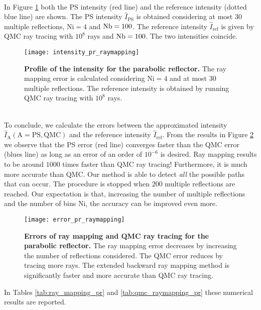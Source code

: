 \\ \indent In Figure \ref{fig:intensity_pr_raymapping} both the PS intensity (red line) and the reference intensity (dotted blue line) are shown. The PS intensity $\hat{I}_{\textrm{PS}}$ is obtained considering at most $30$ multiple reflections, $\textrm{Ni}=4$ and $\textrm{Nb} = 100$. The reference intensity $\hat{I}_{\textrm{ref}}$ is given by QMC ray tracing with $10^8$ rays and $\textrm{Nb} = 100$. The two intensities coincide.
\begin{figure}[t]
  \begin{center}
  \texttt{[image: intensity\_pr\_raymapping]}
  \end{center}
  \caption{\textbf{Profile of the intensity for the parabolic reflector.}
The ray mapping error is calculated considering $\textrm{Ni}=4$ and at most $30$ multiple reflections. The reference intensity is obtained by running QMC ray tracing with $10^8$ rays.}
\label{fig:intensity_pr_raymapping}
 \end{figure}
\\ \indent
To conclude, we calculate the errors between the approximated intensity $\hat{I}_{\textrm{A}} (\textrm{A}=\textrm{PS}, \textrm{QMC})$ and the reference intensity $\hat{I}_{\textrm{ref}}$. From the results in Figure \ref{fig:error_raymapping_pr} we observe that the PS error (red line) converges faster than the QMC error (blues line) as long as an error of an order of $10^{-6}$ is desired. Ray mapping results to be around $1000$ times faster than QMC ray tracing! Furthermore, it is much more accurate than QMC. Our method is able to detect \textit{all} the possible paths that can occur. The procedure is stopped when $200$ multiple reflections are reached. Our expectation is that, increasing the number of multiple reflections and the number of bins $\textrm{Ni}$, the accuracy can be improved even more.
\begin{figure}[h]
  \begin{center}
  \texttt{[image: error\_pr\_raymapping]}
  \end{center}
  \caption{\textbf{Errors of ray mapping and QMC ray tracing for the parabolic reflector.}
The ray mapping error decreases by increasing the number of reflections considered.
The QMC error reduces by tracing more rays.
 The extended backward ray mapping method is significantly faster and more accurate than QMC ray tracing.}
\label{fig:error_raymapping_pr}
 \end{figure}
In Tables \ref{tab:ray_mapping_pr} and \ref{tab:qmc_raymapping_pr} these numerical results are reported.
